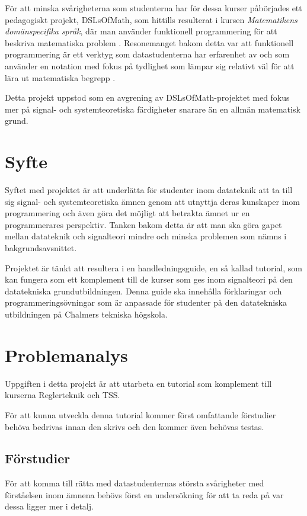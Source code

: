 \documentclass{article}
\begin{document}
För att minska svårigheterna som studenterna har för dessa kurser
påbörjades ett pedagogiskt projekt, DSLsOfMath, som hittills
resulterat i kursen \textit{Matematikens domänspecifika språk}, där man
använder funktionell programmering för att beskriva matematiska problem \cite{kursplan:dslsofmath}.
Resonemanget bakom detta var att funktionell programmering är ett
verktyg som datastudenterna har erfarenhet av och som använder en
notation med fokus på tydlighet som lämpar sig relativt väl för
att lära ut matematiska begrepp \cite{tfpie}.

Detta projekt uppstod som en avgrening av DSLsOfMath-projektet med
fokus mer på signal- och systemteoretiska färdigheter snarare än
en allmän matematisk grund.

\section{Syfte}
Syftet med projektet är att underlätta för studenter inom datateknik
att ta till sig signal- och systemteoretiska ämnen genom att utnyttja
deras kunskaper inom programmering och även göra det möjligt att
betrakta ämnet ur en programmerares perspektiv.
Tanken bakom detta är att man ska göra gapet mellan
datateknik och signalteori mindre och minska problemen
som nämns i bakgrundsavsnittet.

Projektet är tänkt att resultera i en handledningsguide, en så kallad
tutorial, som kan fungera som ett komplement till de kurser som ges
inom signalteori på den datatekniska grundutbildningen.
Denna guide ska innehålla förklaringar och programmeringsövningar
som är anpassade för studenter på den datatekniska utbildningen på Chalmers tekniska högskola.

\section{Problemanalys}
Uppgiften i detta projekt är att utarbeta en tutorial som
komplement till kurserna Reglerteknik och TSS.

För att kunna utveckla denna tutorial kommer först omfattande
förstudier behöva bedrivas innan den skrivs och den kommer även behövas testas.

\subsection{Förstudier}
För att komma till rätta med datastudenternas
största svårigheter med förståelsen inom ämnena
behövs först en undersökning för att ta reda på
var dessa ligger mer i detalj.
\end{document}
